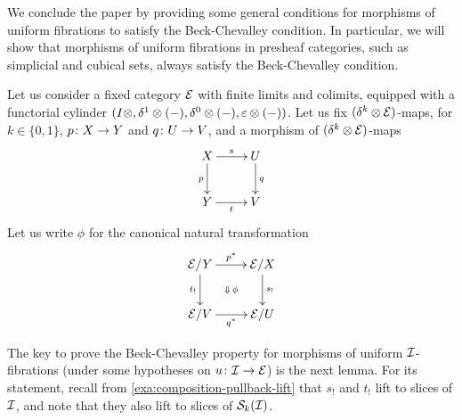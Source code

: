 \documentclass[reqno,10pt,a4paper,oneside]{amsart}
\begin{document}
We conclude the paper by providing some general conditions for morphisms of uniform fibrations to satisfy the Beck-Chevalley condition.
In particular, we will show that morphisms of uniform fibrations in presheaf categories, such as simplicial and cubical sets, always satisfy the Beck-Chevalley condition.


\medskip

Let us consider a fixed category $\catE$ with finite limits and colimits, equipped with a functorial cylinder $(\interval \otimes, \rcyl \otimes (-), \lcyl \otimes (-), \ccyl \otimes (-))$.
Let us fix $(\kcyl \otimes \catE)$-maps, for $k \in \{0 , 1\}$, $p \co X \to Y$ and $q \co U \to V$, and a morphism of $(\kcyl \otimes \catE)$-maps
\begin{equation} \label{strong-h-equiv-base-change-along-fibration-BC:0}
\begin{gathered}
\xymatrix{
X \ar[r]^s \ar[d]_{p} & U \ar[d]^{q} \\
Y \ar[r]_t & V}
\end{gathered}
\end{equation}
Let us write $\phi$ for the canonical natural transformation
\begin{equation} \label{strong-h-equiv-base-change-along-fibration-BC:1}
\begin{gathered}
\xymatrix{
  \catE/Y
  \ar[r]^{p^*}
  \ar[d]_{t_!}
  \ar@{}[dr]|{\Downarrow \, \phi}
&
  \catE/X
  \ar[d]^{s_!}
\\
  \catE/V
  \ar[r]_{q^*}
&
  \catE/U
}
\end{gathered}
\end{equation}

The key to prove the Beck-Chevalley property for morphisms of uniform $\cal{I}$-fibrations (under some hypotheses on $u \co \cal{I} \to \cal{E}$) is the next lemma.
For its statement, recall from \cref{exa:composition-pullback-lift} that $s_!$ and $t_!$ lift to slices of $\cal{I}$, and note that they also lift to slices of $\cal{S}_k(\cal{I})$.
\end{document}
